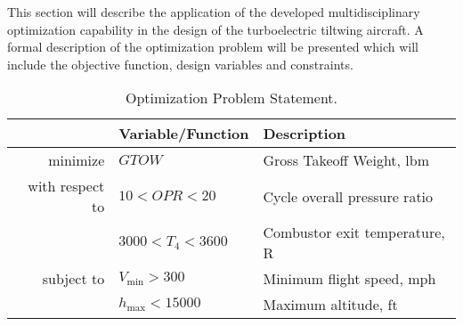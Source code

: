 
This section will describe the application of the developed multidisciplinary optimization capability in the design of the turboelectric tiltwing aircraft.
A formal description of the optimization problem will be presented which will include the objective function, design variables and constraints.


\begin{table}[!htb]
 \normalsize
 \begin{center}
  \caption{Optimization Problem Statement.}
  \label{t:opt_statement}
    \begin{tabular}{ r l l }
        \hline 
         & \textbf{Variable/Function} & \textbf{Description} \\ 
        \hline 
        minimize & $GTOW$ & Gross Takeoff Weight, lbm \vspace{1em} \\
        with respect to & $10 < OPR < 20$ & Cycle overall pressure ratio \\
         & $3000 < T_{\text{4}} < 3600$ & Combustor exit temperature, R \\
        subject to & $V_{\text{min}} > 300$ & Minimum flight speed, mph\\
         & $h_{\text{max}} < 15000$ & Maximum altitude, ft \\
        \hline
    \end{tabular}
 \end{center}
\end{table}

